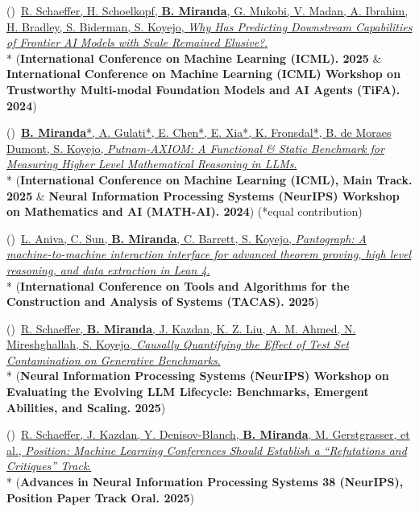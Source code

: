 \documentclass{article}
\newenvironment{changemargin}[2]{%
  \begin{list}{}{%
    \setlength{\topsep}{0pt}%
    \setlength{\leftmargin}{#1}%
    \setlength{\rightmargin}{#2}%
    \setlength{\listparindent}{\parindent}%
    \setlength{\itemindent}{\parindent}%
    \setlength{\parsep}{\parskip}%
  }%
  \item[]}{\end{list}
}
\newenvironment{body} {
		\vspace*{-16pt}
		\begin{changemargin}{-0.25in}{-0.5in}
	  }
		{\end{changemargin}\vspace{8pt plus 12pt}
	}
\newcounter{pubnum}
\newcommand{\pubitem}{\stepcounter{pubnum}(\thepubnum)~}
\begin{document}
\begin{body}
    \vspace{10pt}
    \pubitem \href{https://arxiv.org/pdf/2406.04391}
    {R. Schaeffer, H. Schoelkopf, \textbf{B. Miranda}, G. Mukobi, V. Madan, A. Ibrahim, H. Bradley, S. Biderman, S. Koyejo,
    \emph{Why Has Predicting Downstream Capabilities of Frontier AI Models with Scale Remained Elusive?}.}
    \\*
    (\textbf{International Conference on Machine Learning (ICML). 2025} \& \textbf{International Conference on Machine Learning (ICML) Workshop on Trustworthy Multi-modal Foundation Models and AI Agents (TiFA). 2024})

    \vspace{10pt}
    \pubitem \href{https://openreview.net/forum?id=kqj2Cn3Sxr}
    {\textbf{B. Miranda}*, A. Gulati*, E. Chen*, E. Xia*, K. Fronsdal*, B. de Moraes Dumont, S. Koyejo,
    \emph{Putnam-AXIOM: A Functional \& Static Benchmark for Measuring Higher Level Mathematical Reasoning in LLMs}.}
    \\*
    (\textbf{International Conference on Machine Learning (ICML), Main Track. 2025} \& \textbf{Neural Information Processing Systems (NeurIPS) Workshop on Mathematics and AI (MATH-AI). 2024}) (*equal contribution)

    \pubitem \href{https://link.springer.com/chapter/10.1007/978-3-031-90643-5_6}
    {L. Aniva, C. Sun, \textbf{B. Miranda}, C. Barrett, S. Koyejo,
    \emph{Pantograph: A machine-to-machine interaction interface for advanced theorem proving, high level reasoning, and data extraction in Lean 4}.}
    \\*
    (\textbf{International Conference on Tools and Algorithms for the Construction and Analysis of Systems (TACAS). 2025})

    \vspace{10pt}
    \pubitem \href{https://openreview.net/forum?id=RsmjshBEDP}
    {R. Schaeffer, \textbf{B. Miranda}, J. Kazdan, K. Z. Liu, A. M. Ahmed, N. Mireshghallah, S. Koyejo,
    \emph{Causally Quantifying the Effect of Test Set Contamination on Generative Benchmarks}.}
    \\*
    (\textbf{Neural Information Processing Systems (NeurIPS) Workshop on Evaluating the Evolving LLM Lifecycle: Benchmarks, Emergent Abilities, and Scaling. 2025})

    \vspace{10pt}
    \pubitem \href{https://papers.nips.cc/paper_files/paper/2025/hash/9118ad115831e52cfeec1acd40c6e0f3-Abstract-Position_Paper_Track.html}
    {R. Schaeffer, J. Kazdan, Y. Denisov-Blanch, \textbf{B. Miranda}, M. Gerstgrasser, et al.,
    \emph{Position: Machine Learning Conferences Should Establish a ``Refutations and Critiques'' Track}.}
    \\*
    (\textbf{Advances in Neural Information Processing Systems 38 (NeurIPS), Position Paper Track Oral. 2025})


\end{body}
\end{document}
